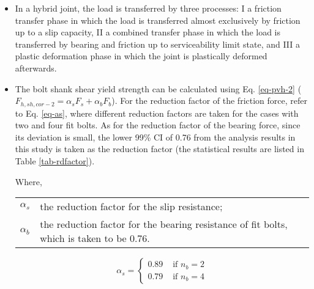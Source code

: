 \begin{itemize}

\item In a hybrid joint, the load is transferred by three processes: \RN{1} a friction transfer phase in which the load is transferred almost exclusively by friction up to a slip capacity, \RN{2} a combined transfer phase in which the load is transferred by bearing  and friction up to serviceability limit state, and \RN{3} a plastic deformation phase in which the joint is plastically deformed afterwards. 

\item The bolt shank shear yield strength can be calculated using Eq. \ref{eq-pvh-2} ($F_{h,sh,cor-2} = \alpha_s F_s+\alpha_{b} F_b$). For the reduction factor of the friction force, refer to Eq. \ref{eq-as}, where different reduction factors are taken for the cases with two and four fit bolts. As for the reduction factor of the bearing force, since its deviation is small, the lower 99\% CI of 0.76 from the analysis results in this study is taken as the reduction factor (the statistical results are listed in Table \ref{tab-rdfactor}). 

Where,
\begin{tabularx}{0.95\linewidth}{ l X }
$\alpha_s$ & the reduction factor for the slip resistance;\\ 
$\alpha_b$ & the reduction factor for the bearing resistance of fit bolts, which is taken to be 0.76.\\
\end{tabularx}

\begin{equation}
\alpha_s =
\begin{cases} 
0.89 & \text { if } n_b = 2 \\ 
0.79 & \text { if } n_b = 4
\end{cases}
\end{equation}





\end{itemize}

